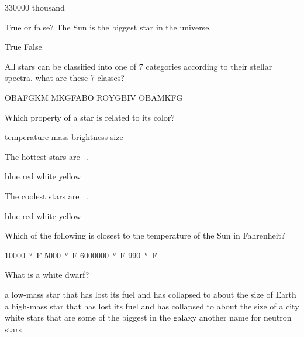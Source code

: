 \documentclass[addpoints]{exam}
\begin{document}
\begin{questions}
\begin{randomizechoices}
\choice \SI{330000}{}
 thousand
\end{randomizechoices}

\question
True or false? The Sun is the biggest star in the universe.

\begin{randomizechoices}
\choice True
\correctchoice False
\end{randomizechoices}

\question
All stars can be classified into one of 7 categories according to their stellar spectra. what are these 7 classes?

\begin{randomizechoices}
\correctchoice OBAFGKM
\choice MKGFABO
\choice  ROYGBIV
\choice OBAMKFG
\end{randomizechoices}

\clearpage
\question
Which property of a star is related to its color?

\begin{randomizechoices}
\correctchoice temperature
\choice mass
\choice brightness
\choice size
\end{randomizechoices}

\question
The hottest stars are \fillin\ .

\begin{randomizechoices}
\correctchoice blue
\choice red
\choice white
\choice yellow
\end{randomizechoices}

\question
The coolest stars are \fillin\ .

\begin{randomizechoices}
\choice blue
\correctchoice red
\choice white
\choice yellow
\end{randomizechoices}

\question
Which of the following is closest to the temperature of the Sun in Fahrenheit? 

\begin{randomizechoices}
\correctchoice \SI{10000}{\degree F}
\choice \SI{5000}{\degree F}
\choice \SI{6000000}{\degree F}
\choice \SI{990}{\degree F}
\end{randomizechoices}

\question
What is a white dwarf?

\begin{randomizechoices}
\correctchoice a low-mass star that has lost its fuel and has collapsed to about the size of Earth
\choice a high-mass star that has lost its fuel and has collapsed to about the size of a city
\choice white stars that are some of the biggest in the galaxy
\choice another name for neutron stars
\end{randomizechoices}


\end{questions}
\end{document}

